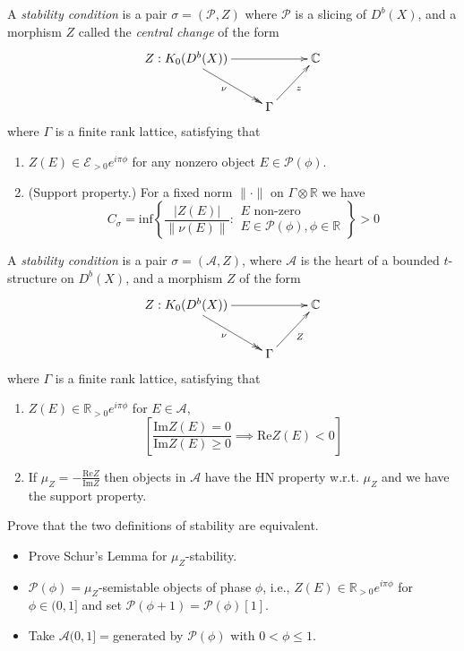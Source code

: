 \begin{definition}
\label{definition-stability-condition-1}
A {\it stability condition} is a pair
$\sigma=(\mathcal{P},Z)$ where $\mathcal{P}$
is a slicing of $D^b(X)$, and a morphism $Z$
called the  {\it central change} of the form
$$
\xymatrix{
Z:K_0(D^b(X))\ar[rr]\ar@{->>}[dr]_\nu&  &
\mathbb{C}\\
&  \Gamma \ar[ur]_z
}
$$
where $\Gamma$ is a finite rank lattice,
satisfying that
\begin{enumerate}
\item $Z(E) \in \mathcal{E}_{>0}e^{i\pi
\phi}$ for any nonzero object $E \in
\mathcal{P}(\phi)$.
\item (Support property.)
For a fixed norm $\|\cdot\|$ on $\Gamma
\otimes \mathbb{R}$ we have
$$
C_{\sigma}=\text{inf}\left\{
\frac{|Z(E)|}{\|\nu(E)\|}:\substack{
\text{$E$ non-zero} \\ E \in
\mathcal{P}(\phi),\phi \in \mathbb{R}}
\right\} >0
$$
\end{enumerate}
\end{definition}

\begin{definition}
\label{definition-stability-condition-2}
A {\it stability condition} is a pair
$\sigma=(\mathcal{A},Z)$, where $\mathcal{A}$
is the heart of a bounded $t$-structure on
$D^b(X)$, and a morphism $Z$ of the form
$$
\xymatrix{
Z:K_0(D^b(X))\ar[rr]\ar@{->>}[dr]_\nu&  &
\mathbb{C}\\
&  \Gamma \ar[ur]_Z
}
$$
where $\Gamma$ is a finite rank lattice,
satisfying that
\begin{enumerate}
\item $Z(E) \in \mathbb{R}_{>0}e^{i\pi \phi}$
for $E \in \mathcal{A}$,
$$
\left[
\frac{\text{Im}Z(E)=0}{\text{Im}Z(E)\geq
0}\implies
\text{Re}Z(E)<0 \right]
$$
\item If
$\mu_Z=-\frac{\text{Re}Z}{\text{Im}Z}$ then
objects in $\mathcal{A}$
have the HN property w.r.t. $\mu_Z$ and we
have the support property.
\end{enumerate}
\end{definition}

\begin{exercise}
\label{exercise-definitions-are-equivalent}
Prove that the two definitions of stability
are equivalent.
\begin{itemize}
\item Prove Schur's Lemma for
$\mu_Z$-stability.
\item $\mathcal{P}(\phi)=\mu_Z$-semistable
objects of phase $\phi$, i.e., $Z(E)
\in \mathbb{R}_{>0}e^{i\pi\phi}$ for $\phi
\in (0,1]$ and set
$\mathcal{P}(\phi+1)=\mathcal{P}(\phi)[1]$.
\item Take $\mathcal{A}(0,1]=$generated by
$\mathcal{P}(\phi)$ with
$0<\phi\leq 1$.
\end{itemize}
\end{exercise}

